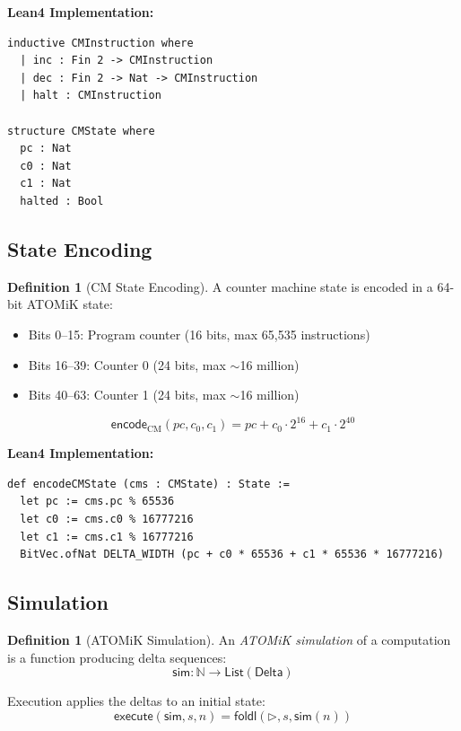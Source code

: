\documentclass[11pt,letterpaper]{article}
\theoremstyle{plain}
\theoremstyle{definition}
\newtheorem{definition}[theorem]{Definition}
\theoremstyle{remark}
\newcommand{\transition}{\triangleright} %
\newcommand{\DeltaType}{\mathsf{Delta}}
\begin{document}
\noindent\textbf{Lean4 Implementation:}
\begin{lstlisting}
inductive CMInstruction where
  | inc : Fin 2 -> CMInstruction
  | dec : Fin 2 -> Nat -> CMInstruction
  | halt : CMInstruction

structure CMState where
  pc : Nat
  c0 : Nat
  c1 : Nat
  halted : Bool
\end{lstlisting}

\subsection{State Encoding}

\begin{definition}[CM State Encoding]
\label{def:cm-encode}
A counter machine state is encoded in a 64-bit ATOMiK state:
\begin{itemize}
    \item Bits 0--15: Program counter (16 bits, max 65,535 instructions)
    \item Bits 16--39: Counter 0 (24 bits, max $\sim$16 million)
    \item Bits 40--63: Counter 1 (24 bits, max $\sim$16 million)
\end{itemize}

\[
\mathsf{encode}_{\text{CM}}(\mathit{pc}, c_0, c_1) = \mathit{pc} + c_0 \cdot 2^{16} + c_1 \cdot 2^{40}
\]
\end{definition}

\noindent\textbf{Lean4 Implementation:}
\begin{lstlisting}
def encodeCMState (cms : CMState) : State :=
  let pc := cms.pc % 65536
  let c0 := cms.c0 % 16777216
  let c1 := cms.c1 % 16777216
  BitVec.ofNat DELTA_WIDTH (pc + c0 * 65536 + c1 * 65536 * 16777216)
\end{lstlisting}

\subsection{Simulation}

\begin{definition}[ATOMiK Simulation]
\label{def:simulation}
An \emph{ATOMiK simulation} of a computation is a function producing delta sequences:
\[
\mathsf{sim} : \mathbb{N} \to \mathsf{List}(\DeltaType)
\]

Execution applies the deltas to an initial state:
\[
\mathsf{execute}(\mathsf{sim}, s, n) = \mathsf{foldl}(\transition, s, \mathsf{sim}(n))
\]
\end{definition}
\end{document}
